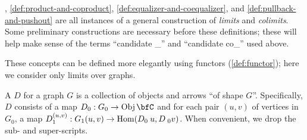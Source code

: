 \documentclass[a5paper]{article}
\begin{document}
, \cref{def:product-and-coproduct},
\cref{def:equalizer-and-coequalizer}, and \cref{def:pullback-and-pushout}
are all instances of a general construction of \textit{limits} and
\textit{colimits}. Some preliminary constructions are necessary before these
definitions; these will help make sense of the terms ``candidate \_'' and
``candidate co\_'' used above.

These concepts can be defined more elegantly using functors
(\cref{def:functor}); here we consider only limits over graphs.


\begin{definition}
  A  $D$ for a graph $G$ is a collection
  of objects and arrows ``of shape $G$''. Specifically, $D$ consists of a map
  $D_0:G_0\to \Obj\bfC$ and for each pair $(u,v)$ of vertices in $G_0$,
  a map $D_{1}^{(u,v)}:G_1(u,v)\to \operatorname{Hom}(D_0\hspace{0.23em} u,D\hspace{0.23em} _0{v})$.
  When convenient, we drop the sub- and super-scripts.
\end{definition}
\end{document}
